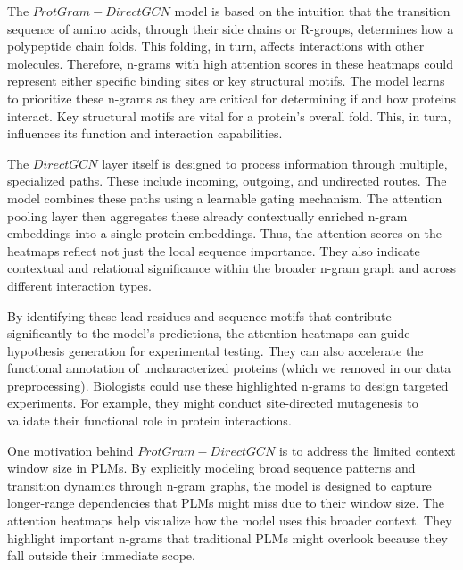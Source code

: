 \documentclass[utf8]{FrontiersinHarvard}
\begin{document}
	The $ProtGram-DirectGCN$ model is based on the intuition that the transition sequence of amino acids, through their side chains or R-groups, determines how a polypeptide chain folds. This folding, in turn, affects interactions with other molecules. Therefore, n-grams with high attention scores in these heatmaps could represent either specific binding sites or key structural motifs. The model learns to prioritize these n-grams as they are critical for determining if and how proteins interact. Key structural motifs are vital for a protein's overall fold. This, in turn, influences its function and interaction capabilities.
	
	The $DirectGCN$ layer itself is designed to process information through multiple, specialized paths. These include incoming, outgoing, and undirected routes. The model combines these paths using a learnable gating mechanism. The attention pooling layer then aggregates these already contextually enriched n-gram embeddings into a single protein embeddings. Thus, the attention scores on the heatmaps reflect not just the local sequence importance. They also indicate contextual and relational significance within the broader n-gram graph and across different interaction types.
	
	By identifying these lead residues and sequence motifs that contribute significantly to the model's predictions, the attention heatmaps can guide hypothesis generation for experimental testing. They can also accelerate the functional annotation of uncharacterized proteins (which we removed in our data preprocessing). Biologists could use these highlighted n-grams to design targeted experiments. For example, they might conduct site-directed mutagenesis to validate their functional role in protein interactions.
	
	One motivation behind $ProtGram-DirectGCN$ is to address the limited context window size in PLMs. By explicitly modeling broad sequence patterns and transition dynamics through n-gram graphs, the model is designed to capture longer-range dependencies that PLMs might miss due to their window size. The attention heatmaps help visualize how the model uses this broader context. They highlight important n-grams that traditional PLMs might overlook because they fall outside their immediate scope.
	
\end{document}
